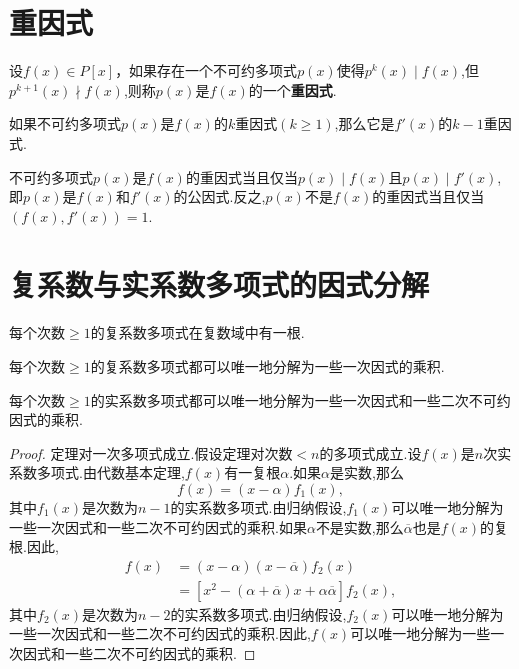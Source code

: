 \section{重因式}
\begin{definition}
    设$f(x)\in P[x]$，如果存在一个不可约多项式$p(x)$使得$p^k(x)\mid f(x)$,但$p^{k+1}(x)\nmid f(x)$,则称$p(x)$是$f(x)$的一个\textbf{重因式}.
\end{definition}
\begin{definition}
    如果不可约多项式$p(x)$是$f(x)$的$k$重因式$(k\geq 1)$,那么它是$f'(x)$的$k-1$重因式.
\end{definition}
\begin{theorem}
    不可约多项式$p(x)$是$f(x)$的重因式当且仅当$p(x)\mid f(x)$且$p(x)\mid f'(x)$,即$p(x)$是$f(x)$和$f'(x)$的公因式.反之,$p(x)$不是$f(x)$的重因式当且仅当$(f(x),f'(x))=1$.
\end{theorem}

\section{复系数与实系数多项式的因式分解}
\begin{theorem}[代数基本定理]
    每个次数$\geq 1$的复系数多项式在复数域中有一根.
\end{theorem}
\begin{theorem}[复系数多项式因式分解定理]
    每个次数$\geq 1$的复系数多项式都可以唯一地分解为一些一次因式的乘积.
\end{theorem}
\begin{theorem}[实系数多项式因式分解定理]
    每个次数$\geq 1$的实系数多项式都可以唯一地分解为一些一次因式和一些二次不可约因式的乘积.
\end{theorem}
\begin{proof}
    定理对一次多项式成立.假设定理对次数$<n$的多项式成立.设$f(x)$是$n$次实系数多项式.由代数基本定理,$f(x)$有一复根$\alpha$.如果$\alpha$是实数,那么
    \begin{equation*}
        f(x)=(x-\alpha)f_1(x),
    \end{equation*}其中$f_1(x)$是次数为$n-1$的实系数多项式.由归纳假设,$f_1(x)$可以唯一地分解为一些一次因式和一些二次不可约因式的乘积.如果$\alpha$不是实数,那么$\overline{\alpha}$也是$f(x)$的复根.因此,
    \begin{align*}
        f(x)&=(x-\alpha)(x-\overline{\alpha})f_2(x)\\
        &=[x^2-(\alpha+\overline{\alpha})x+\alpha\overline{\alpha}]f_2(x),
    \end{align*}其中$f_2(x)$是次数为$n-2$的实系数多项式.由归纳假设,$f_2(x)$可以唯一地分解为一些一次因式和一些二次不可约因式的乘积.因此,$f(x)$可以唯一地分解为一些一次因式和一些二次不可约因式的乘积.
\end{proof}

